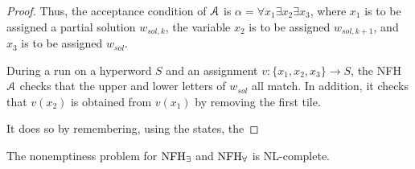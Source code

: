 \begin{proof}
Thus, the acceptance condition of $\mathcal{A}$ is $\alpha = \forall x_1\exists x_2 \exists x_3$, where $x_1$ is to be assigned a partial solution $w_{sol,k}$, the variable $x_2$ is to be assigned $w_{sol,k+1}$, and $x_3$ is to be assigned $w_{sol}$.  

During a run on a hyperword $S$ and an assignment $v:\{x_1,x_2,x_3\}\rightarrow S$, the NFH $\mathcal{A}$ checks that the upper and lower letters of $w_{sol}$ all match.
In addition, it checks that $v(x_2)$ is obtained from $v(x_1)$ by removing the first tile. 

It does so by remembering, using the states, the  




\end{proof}



\begin{theorem} \label{thm:nfhe.nfhf.nonemptiness}
The nonemptiness problem for $\textrm{NFH}_{\exists}$ and $\textrm{NFH}_{\forall}$ is NL-complete.
\end{theorem}


